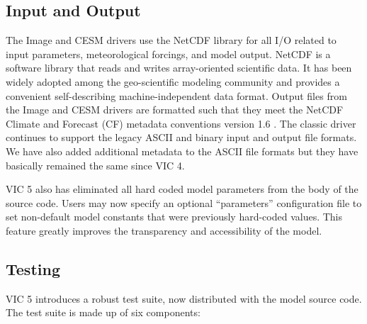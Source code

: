 \documentclass[gmd, manuscript]{copernicus}
\begin{document}
  \subsection{Input and Output}
    \label{sec:io}
    The Image and CESM drivers use the NetCDF library for all I/O related to input parameters, meteorological forcings, and model output.
    NetCDF is a software library that reads and writes array-oriented scientific data.
    It has been widely adopted among the geo-scientific modeling community and provides a convenient self-describing machine-independent data format.
    Output files from the Image and CESM drivers are formatted such that they meet the NetCDF Climate and Forecast (CF) metadata conventions version 1.6 \citep{Eaton_2003}.
    The classic driver continues to support the legacy ASCII and binary input and output file formats.
    We have also added additional metadata to the ASCII file formats but they have basically remained the same since VIC 4.

    VIC 5 also has eliminated all hard coded model parameters from the body of the source code.
    Users may now specify an optional ``parameters'' configuration file to set non-default model constants that were previously hard-coded values.
    This feature greatly improves the transparency and accessibility of the model.

  \subsection{Testing}
    \label{sec:testing}
    VIC 5 introduces a robust test suite, now distributed with the model source code.
    The test suite is made up of six components:
\end{document}

